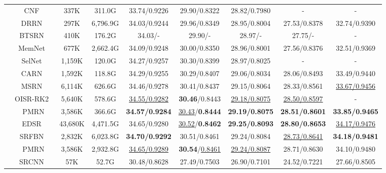 \documentclass[journal]{IEEEtran}
\begin{document}
\begin{table*}[!ht]
\begin{tabular}{|c|c|c|c|c|c|c|c|c|}
		&CNF~\cite{cnf_ren2017image}&337K&311.0G& 
		33.74/0.9226& 29.90/0.8322& 28.82/0.7980& - & - \\
		
		&DRRN~\cite{drrn_tai2017image}&297K&6,796.9G& 
		34.03/0.9244& 29.96/0.8349& 28.95/0.8004& 27.53/0.8378& 32.74/0.9390\\
		
		&BTSRN~\cite{btsrn_fan2017balanced}&410K&176.2G& 
		34.03/-& 29.90/-& 28.97/-& 27.75/-& -\\
		
		&MemNet~\cite{memnet}&677K&2,662.4G& 
		34.09/0.9248& 30.00/0.8350& 28.96/0.8001& 27.56/0.8376& 32.51/0.9369 \\
		
		&SelNet~\cite{selnet_choi2017deep}&1,159K&120.0G& 
		34.27/0.9257& 30.30/0.8399& 28.97/0.8025& - &  - \\
		
		&CARN~\cite{carn}&1,592K&118.8G& 
		34.29/0.9255& 30.29/0.8407& 29.06/0.8034& 28.06/0.8493& 33.49/0.9440\\
		
		&MSRN~\cite{msrn}& 6,114K& 626.6G& 
		34.46/0.9278& 30.41/0.8437& 29.15/0.8064& 28.33/0.8561& \underline{33.67/0.9456} \\
		
		&OISR-RK2~\cite{oisr}& 5,640K& 578.6G&
		\underline{34.55/0.9282}& \textbf{30.46}/0.8443& \underline{29.18/0.8075}& \underline{28.50/0.8597}& -\\
		
		&PMRN&3,586K& 366.6G& 
		\textbf{34.57/0.9284}& \underline{30.43}/\textbf{0.8444}& \textbf{29.19/0.8075}& \textbf{28.51/0.8601}& \textbf{33.85/0.9465}  \\
		
		\cline{2-9}
		
		&EDSR~\cite{edsr_lim2017}&43,680K& 4,471.5G& 34.65/0.9280& \underline{30.52}/\textbf{0.8462}& \textbf{29.25/0.8093}& \textbf{28.80/0.8653}& \underline{34.17/0.9476}\\
		
		&SRFBN~\cite{srfbn}&2,832K& 6,023.8G& \textbf{34.70/0.9292}& 30.51/0.8461& 29.24/0.8084& \underline{28.73/0.8641}& \textbf{34.18/0.9481}\\
		


		&PMRN&3,586K& 2,932.8G&\underline{34.65/0.9289}& \textbf{30.54}/\underline{0.8461}& \underline{29.24/0.8087}& 28.71/0.8630& 34.10/0.9480 \\
\hline
		\hline
		\multirow{18}{*}{}&SRCNN~\cite{srcnn}&57K &52.7G & 
		30.48/0.8628& 27.49/0.7503& 26.90/0.7101& 24.52/0.7221& 27.66/0.8505\\
		

\end{tabular}
\end{table*}
\end{document}
